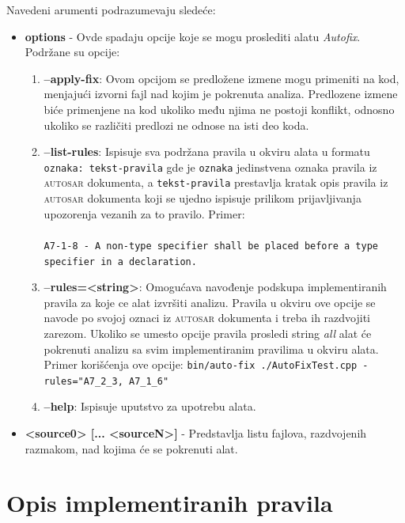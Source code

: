 \documentclass[12pt,oneside]{memoir}
\begin{document}
Navedeni arumenti podrazumevaju sledeće:
\begin{itemize}
  \item \textbf{options} - Ovde spadaju opcije koje se mogu proslediti alatu \textit{Autofix}. Podr\v{z}ane su opcije:
  \begin{enumerate}
    \item \textbf{--apply-fix}: Ovom opcijom se predlo\v{z}ene izmene mogu primeniti na kod, menjaju\'{c}i izvorni fajl nad kojim je pokrenuta analiza.
    Predlozene izmene bi\'{c}e primenjene na kod ukoliko među njima ne postoji konflikt, odnosno ukoliko se razli\v{c}iti predlozi ne odnose na isti deo koda.
    \item \textbf{--list-rules}: Ispisuje sva podr\v{z}ana pravila u okviru alata u formatu \texttt{oznaka: tekst-pravila} gde je \texttt{oznaka} jedinstvena oznaka pravila iz \textsc{autosar} dokumenta, a \texttt{tekst-pravila} prestavlja kratak opis pravila iz \textsc{autosar} dokumenta koji se ujedno ispisuje prilikom prijavljivanja upozorenja vezanih za to pravilo. Primer: \\ \\
  \texttt{A7-1-8 - A non-type specifier shall be placed before a type specifier in a declaration.} \\
    \item \textbf{--rules=<string>}: Omogu\'{c}ava navođenje podskupa implementiranih pravila za koje ce alat izvr\v{s}iti analizu. Pravila u okviru ove opcije
    se navode po svojoj oznaci iz \textsc{autosar} dokumenta i treba ih razdvojiti zarezom. Ukoliko se umesto opcije pravila prosledi string \textit{all} alat \'{c}e pokrenuti
    analizu sa svim implementiranim pravilima u okviru alata. Primer kori\v{s}\'{c}enja ove opcije: \newline\newline
    \texttt{bin/auto-fix ./AutoFixTest.cpp -rules="A7\_2\_3, A7\_1\_6"} \\
    \item \textbf{--help}: Ispisuje uputstvo za upotrebu alata.
  \end{enumerate}

\item \textbf{<source0> [... <sourceN>]} - Predstavlja listu fajlova, razdvojenih razmakom, nad kojima \'{c}e se pokrenuti alat.

\end{itemize}

\section{Opis implementiranih pravila}
\end{document}

